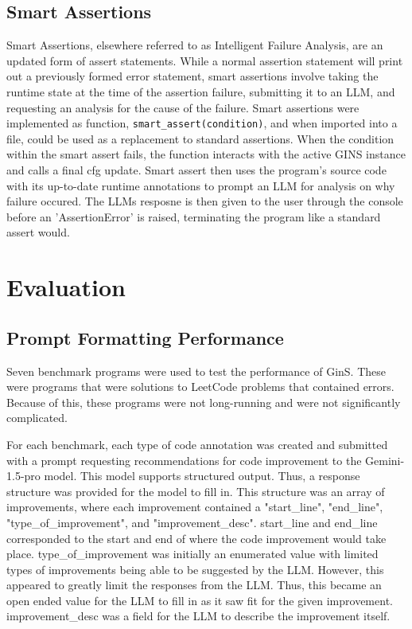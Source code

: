 \documentclass[sigconf]{acmart}
\begin{document}
\subsection{Smart Assertions}
Smart Assertions, elsewhere referred to as Intelligent Failure Analysis, are an updated form of assert statements.
While a normal assertion statement will print out a previously formed error statement, smart assertions involve taking the runtime state at the time of the assertion failure, submitting it to an LLM, and requesting an analysis for the cause of the failure.
Smart assertions were implemented as function, \texttt{smart\_assert(condition)}, and when imported into a file, could be used as a replacement to standard assertions. When the condition within the smart assert fails, the function interacts with the active GINS instance and calls a final cfg update.
Smart assert then uses the program's source code with its up-to-date runtime annotations to prompt an LLM for analysis on why failure occured.
The LLMs resposne is then given to the user through the console before an 'AssertionError' is raised, terminating the program like a standard assert would.

\section{Evaluation}
\subsection{Prompt Formatting Performance}

Seven benchmark programs were used to test the performance of GinS.
These were programs that were solutions to LeetCode problems that contained errors.
Because of this, these programs were not long-running and were not significantly complicated.

For each benchmark, each type of code annotation was created and submitted with a prompt requesting recommendations for code improvement to the Gemini-1.5-pro model.
This model supports structured output.
Thus, a response structure was provided for the model to fill in.
This structure was an array of improvements, where each improvement contained a "start\_line", "end\_line", "type\_of\_improvement", and "improvement\_desc".
start\_line and end\_line corresponded to the start and end of where the code improvement would take place.
type\_of\_improvement was initially an enumerated value with limited types of improvements being able to be suggested by the LLM.
However, this appeared to greatly limit the responses from the LLM.
Thus, this became an open ended value for the LLM to fill in as it saw fit for the given improvement.
improvement\_desc was a field for the LLM to describe the improvement itself.
\end{document}
